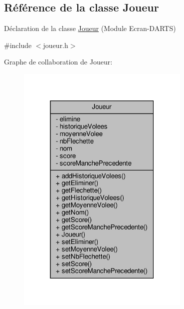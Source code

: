 \hypertarget{class_joueur}{}\subsection{Référence de la classe Joueur}
\label{class_joueur}


Déclaration de la classe \hyperlink{class_joueur}{Joueur} (Module Ecran-\/\+D\+A\+R\+TS)  




{\ttfamily \#include $<$joueur.\+h$>$}



Graphe de collaboration de Joueur\+:\nopagebreak
\begin{figure}[H]
\begin{center}
\leavevmode
\includegraphics[width=235pt]{class_joueur__coll__graph}
\end{center}
\end{figure}
